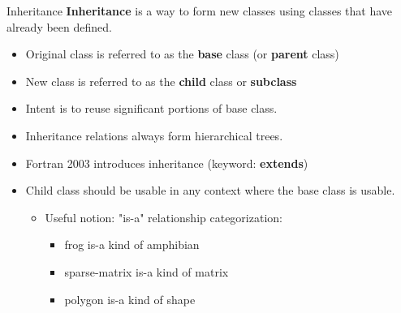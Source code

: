 \documentclass[11pt]{beamer}
\begin{document}

\begin{frame}{Inheritance}
\textbf{Inheritance} is a way to form new classes using classes that have already been defined.
\begin{itemize}

  \item Original class is referred to as the \textbf{base} class (or \textbf{parent} class)
  \item New class is referred to as the \textbf{child} class or \textbf{subclass}
  \item Intent is to reuse significant portions of base class.
  \item Inheritance relations always form hierarchical trees.
  \item Fortran 2003 introduces inheritance (keyword: \textbf{extends})
  \item Child class should be usable in any context where the base class is usable.
  \begin{itemize}
  \item Useful notion: "is-a" relationship categorization:
    \begin{itemize}
    \item frog is-a kind of amphibian
    \item sparse-matrix is-a kind of matrix
    \item polygon is-a kind of shape
    \end{itemize}
  \end{itemize}
  
 \end{itemize}

\end{frame}


\end{document}
